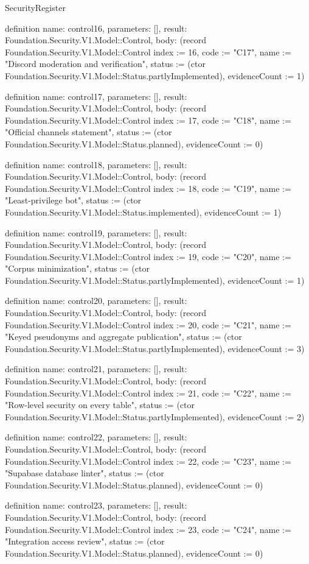 \begin{lexlean}{SecurityRegister}
\begin{semanticmodule}
definition{
  name: control16,
  parameters: [],
  result: Foundation.Security.V1.Model::Control,
  body: (record Foundation.Security.V1.Model::Control {index := 16, code := "C17", name := "Discord moderation and verification", status := (ctor Foundation.Security.V1.Model::Status.partlyImplemented), evidenceCount := 1})
}

definition{
  name: control17,
  parameters: [],
  result: Foundation.Security.V1.Model::Control,
  body: (record Foundation.Security.V1.Model::Control {index := 17, code := "C18", name := "Official channels statement", status := (ctor Foundation.Security.V1.Model::Status.planned), evidenceCount := 0})
}

definition{
  name: control18,
  parameters: [],
  result: Foundation.Security.V1.Model::Control,
  body: (record Foundation.Security.V1.Model::Control {index := 18, code := "C19", name := "Least-privilege bot", status := (ctor Foundation.Security.V1.Model::Status.implemented), evidenceCount := 1})
}

definition{
  name: control19,
  parameters: [],
  result: Foundation.Security.V1.Model::Control,
  body: (record Foundation.Security.V1.Model::Control {index := 19, code := "C20", name := "Corpus minimization", status := (ctor Foundation.Security.V1.Model::Status.partlyImplemented), evidenceCount := 1})
}

definition{
  name: control20,
  parameters: [],
  result: Foundation.Security.V1.Model::Control,
  body: (record Foundation.Security.V1.Model::Control {index := 20, code := "C21", name := "Keyed pseudonyms and aggregate publication", status := (ctor Foundation.Security.V1.Model::Status.partlyImplemented), evidenceCount := 3})
}

definition{
  name: control21,
  parameters: [],
  result: Foundation.Security.V1.Model::Control,
  body: (record Foundation.Security.V1.Model::Control {index := 21, code := "C22", name := "Row-level security on every table", status := (ctor Foundation.Security.V1.Model::Status.partlyImplemented), evidenceCount := 2})
}

definition{
  name: control22,
  parameters: [],
  result: Foundation.Security.V1.Model::Control,
  body: (record Foundation.Security.V1.Model::Control {index := 22, code := "C23", name := "Supabase database linter", status := (ctor Foundation.Security.V1.Model::Status.planned), evidenceCount := 0})
}

definition{
  name: control23,
  parameters: [],
  result: Foundation.Security.V1.Model::Control,
  body: (record Foundation.Security.V1.Model::Control {index := 23, code := "C24", name := "Integration access review", status := (ctor Foundation.Security.V1.Model::Status.planned), evidenceCount := 0})
}


\end{semanticmodule}
\end{lexlean}
